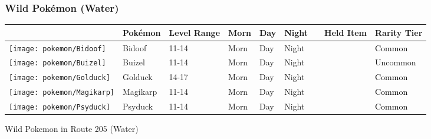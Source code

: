 \subsubsection{Wild Pokémon (Water)}%
\label{ssubsec:WildPokmon(Water)}%
\begin{longtable}{||l l l l l l l l l||}%
\hline%
\rowcolor{WaterColor}%
&Pokémon&Level Range&Morn&Day&Night&&Held Item&Rarity Tier\\%
\hline%
\endhead%
\hline%
\rowcolor{WaterColor}%
\texttt{[image: pokemon/Bidoof]}&Bidoof&11{-}14&Morn&Day&Night&&&\textcolor{black}{%
Common%
}\\%
\hline%
\rowcolor{WaterColor}%
\texttt{[image: pokemon/Buizel]}&Buizel&11{-}14&Morn&Day&Night&&&\textcolor{OliveGreen}{%
Uncommon%
}\\%
\hline%
\rowcolor{WaterColor}%
\texttt{[image: pokemon/Golduck]}&Golduck&14{-}17&Morn&Day&Night&&&\textcolor{black}{%
Common%
}\\%
\hline%
\rowcolor{WaterColor}%
\texttt{[image: pokemon/Magikarp]}&Magikarp&11{-}14&Morn&Day&Night&&&\textcolor{black}{%
Common%
}\\%
\hline%
\rowcolor{WaterColor}%
\texttt{[image: pokemon/Psyduck]}&Psyduck&11{-}14&Morn&Day&Night&&&\textcolor{black}{%
Common%
}\\%
\hline%
\end{longtable}%
\caption{Wild Pokemon in Route 205 (Water)}